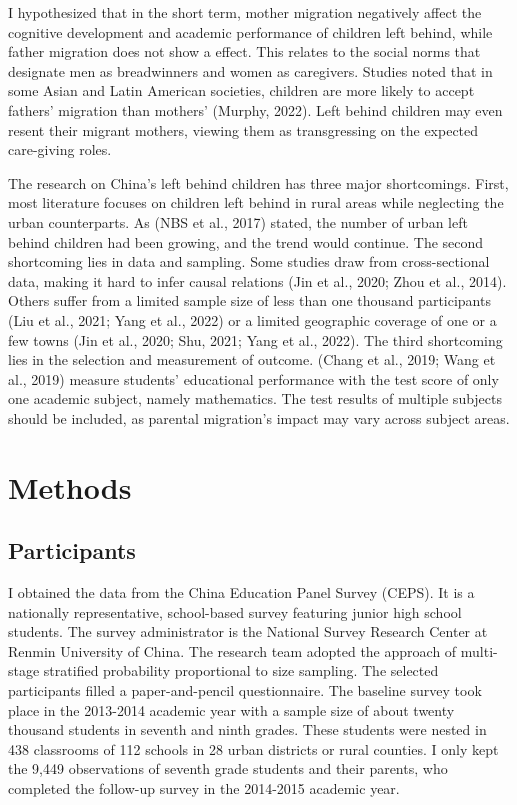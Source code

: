 \documentclass[
  man]{apa7}
\begin{document}
I hypothesized that in the short term, mother migration negatively affect the cognitive development and academic performance of children left behind, while father migration does not show a effect. This relates to the social norms that designate men as breadwinners and women as caregivers. Studies noted that in some Asian and Latin American societies, children are more likely to accept fathers' migration than mothers' (Murphy, 2022). Left behind children may even resent their migrant mothers, viewing them as transgressing on the expected care-giving roles.

The research on China's left behind children has three major shortcomings. First, most literature focuses on children left behind in rural areas while neglecting the urban counterparts. As (NBS et al., 2017) stated, the number of urban left behind children had been growing, and the trend would continue. The second shortcoming lies in data and sampling. Some studies draw from cross-sectional data, making it hard to infer causal relations (Jin et al., 2020; Zhou et al., 2014). Others suffer from a limited sample size of less than one thousand participants (Liu et al., 2021; Yang et al., 2022) or a limited geographic coverage of one or a few towns (Jin et al., 2020; Shu, 2021; Yang et al., 2022). The third shortcoming lies in the selection and measurement of outcome. (Chang et al., 2019; Wang et al., 2019) measure students' educational performance with the test score of only one academic subject, namely mathematics. The test results of multiple subjects should be included, as parental migration's impact may vary across subject areas.

\hypertarget{methods}{%
\section{Methods}\label{methods}}

\hypertarget{participants}{%
\subsection{Participants}\label{participants}}

I obtained the data from the China Education Panel Survey (CEPS). It is a nationally representative, school-based survey featuring junior high school students. The survey administrator is the National Survey Research Center at Renmin University of China. The research team adopted the approach of multi-stage stratified probability proportional to size sampling. The selected participants filled a paper-and-pencil questionnaire. The baseline survey took place in the 2013-2014 academic year with a sample size of about twenty thousand students in seventh and ninth grades. These students were nested in 438 classrooms of 112 schools in 28 urban districts or rural counties. I only kept the 9,449 observations of seventh grade students and their parents, who completed the follow-up survey in the 2014-2015 academic year.
\end{document}
